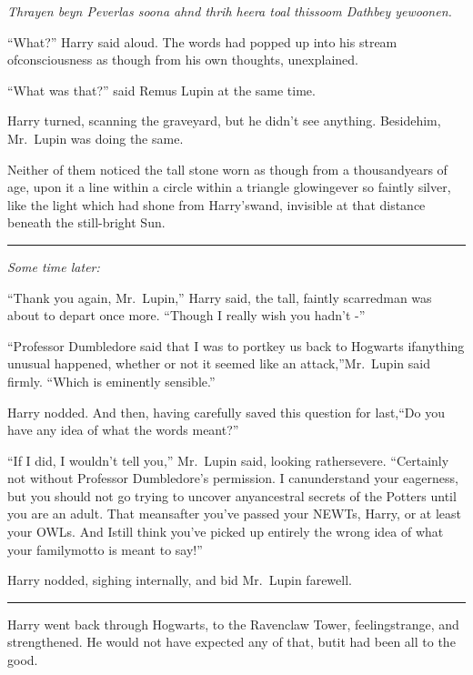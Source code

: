 \emph{Thrayen beyn Peverlas soona ahnd thrih heera toal thissoom Dathbey yewoonen.}

``What?'' Harry said aloud. The words had popped up into his stream ofconsciousness as though from his own thoughts, unexplained.

``What was that?'' said Remus Lupin at the same time.

Harry turned, scanning the graveyard, but he didn't see anything. Besidehim, Mr.~Lupin was doing the same.

Neither of them noticed the tall stone worn as though from a thousandyears of age, upon it a line within a circle within a triangle glowingever so faintly silver, like the light which had shone from Harry'swand, invisible at that distance beneath the still-bright Sun.

\begin{center}\rule{3in}{0.4pt}\end{center}

\emph{Some time later:}

``Thank you again, Mr.~Lupin,'' Harry said, the tall, faintly scarredman was about to depart once more. ``Though I really wish you hadn't -''

``Professor Dumbledore said that I was to portkey us back to Hogwarts ifanything unusual happened, whether or not it seemed like an attack,''Mr.~Lupin said firmly. ``Which is eminently sensible.''

Harry nodded. And then, having carefully saved this question for last,``Do you have any idea of what the words meant?''

``If I did, I wouldn't tell you,'' Mr.~Lupin said, looking rathersevere. ``Certainly not without Professor Dumbledore's permission. I canunderstand your eagerness, but you should not go trying to uncover anyancestral secrets of the Potters until you are an adult. That meansafter you've passed your NEWTs, Harry, or at least your OWLs. And Istill think you've picked up entirely the wrong idea of what your familymotto is meant to say!''

Harry nodded, sighing internally, and bid Mr.~Lupin farewell.

\begin{center}\rule{3in}{0.4pt}\end{center}

Harry went back through Hogwarts, to the Ravenclaw Tower, feelingstrange, and strengthened. He would not have expected any of that, butit had been all to the good.

